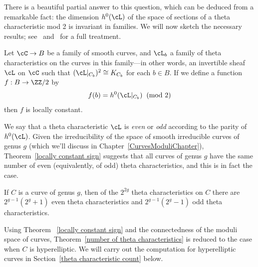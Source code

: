  There is a beautiful partial answer to this question, which can be deduced from a remarkable fact: the dimension $h^0(\cL)$ of the space of sections of a theta characteristic mod 2 is invariant in families.
We will now
sketch the necessary results; see~\cite{MumfordPaper} and~\cite{JHPaper} for a full treatment.

 \begin{theorem}\label{locally constant sign} Let $\cC \to B$ be a family of smooth curves, and $\cL_b$ a family of theta characteristics on the curves in this family---in other words, an invertible sheaf $\cL$ on $\cC$ such that $(\cL|_{C_b})^2 \cong K_{C_b}$ for each $b \in B$. If we define a function $f : B \to \ZZ/2$  by
 $$
 f(b) = h^0(\cL|_{C_b}) \;  \; (\text{mod } 2)
 $$
then $f$ is locally constant.
\end{theorem}

We say that a theta characteristic $\cL$ is \emph{even} or \emph{odd} according to the parity of $h^0(\cL)$. Given the irreducibility of the space of smooth irreducible curves of genus $g$ (which we'll discuss in Chapter~\ref{CurvesModuliChapter}),  Theorem~\ref{locally constant sign} suggests that all curves of genus $g$ have the same number of even (equivalently, of odd) theta characteristics, and this is in fact the case. 

\begin{theorem}\label{number of theta characteristics}
If $C$ is a curve of genus $g$, then of the $2^{2g}$ theta characteristics on $C$ there are $2^{g-1}(2^g + 1)$ even theta characteristics and $2^{g-1}(2^g-1)$ odd theta characteristics.
\end{theorem}

Using Theorem ~\ref{locally constant sign} and the connectedness of the moduli space of curves, 
Theorem~\ref{number of theta characteristics} is reduced to the case when $C$ is hyperelliptic. We will carry out the computation for hyperelliptic curves in Section~\ref{theta characteristic count} below.

